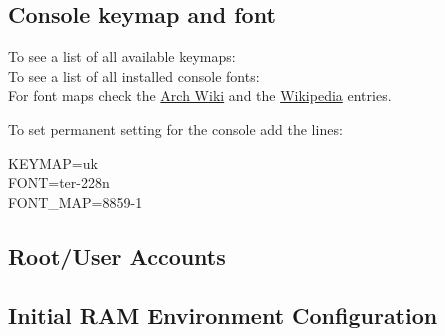 \subsection{Console keymap and font}

To see a list of all available keymaps: \\
To see a list of all installed console fonts: \\
For font maps check the \href{https://wiki.archlinux.org/index.php/fonts#Persistent_configuration}{Arch Wiki} and the \href{https://en.wikipedia.org/wiki/ISO/IEC_8859#The_parts_of_ISO/IEC_8859}{Wikipedia} entries.

\begin{blocksection}
    To set permanent setting for the console add the lines:\\
    \begin{codeblock}
    KEYMAP=uk\\
    FONT=ter-228n\\
    FONT\_MAP=8859-1
    \end{codeblock}
\end{blocksection}

\subsection{Root/User Accounts}


\subsection{Initial RAM Environment Configuration}

\href{https://wiki.archlinux.org/index.php/mkinitcpio}{}

